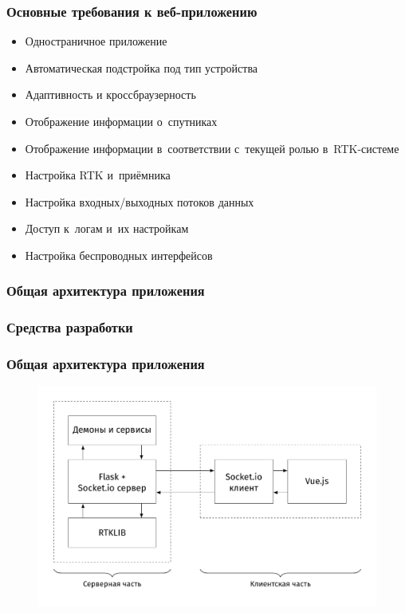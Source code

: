 \documentclass[xetex,t]{beamer}
\begin{document}
%
%
\begin{frame}
  \frametitle{Основные требования к веб-приложению}
  
  \begin{itemize}
    \item Одностраничное приложение
    \item Автоматическая подстройка под тип устройства
    \item Адаптивность и кроссбраузерность
  \end{itemize}
  \begin{center}
    \vskip -0.7cm
    \color{ifmoblue}{\rule{.5\textwidth}{0.5pt}}
  \end{center}
  \vskip -0.5cm
  \begin{itemize}
    \item Отображение информации о~спутниках
    \item Отображение информации в~соответствии с~текущей ролью в~RTK-системе
    \item Настройка RTK и~приёмника
    \item Настройка входных/выходных потоков данных
    \item Доступ к~логам и~их настройкам
    \item Настройка беспроводных интерфейсов
  \end{itemize}
\end{frame}


%
%
\begin{frame}
  \frametitle{Общая архитектура приложения}
\end{frame}


%
%
\begin{frame}
  \frametitle{Средства разработки}
\end{frame}


%
%
\begin{frame}
  \frametitle{Общая архитектура приложения}
  \vskip -0.75cm
  \begin{figure}[h]
    \centering
    \includegraphics[width=.95\textwidth]{../img/tikz/system-architecture/pic_sans_no-border}
  \end{figure}
\end{frame}
\end{document}

